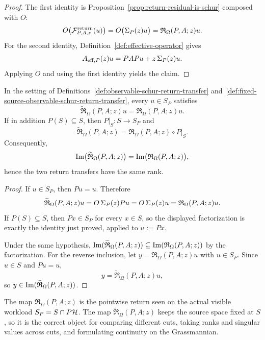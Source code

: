 \begin{proof}
The first identity is Proposition~\ref{prop:return-residual-is-schur} composed
with \(O\):
\[
O\bigl(\mathcal F^{\mathrm{return}}_{P,A,z}(u)\bigr)
=
O\bigl(\Sigma_{P}(z)u\bigr)
=
\mathfrak R_{\Omega}(P,A;z)u.
\]
For the second identity, Definition~\ref{def:effective-operator} gives
\[
A_{\mathrm{eff},P}(z)u=PAPu+z\,\Sigma_{P}(z)u.
\]
Applying \(O\) and using the first identity yields the claim.
\end{proof}

\begin{proposition}
\label{prop:fixed-source-return-restricts}
In the setting of
Definitions~\ref{def:observable-schur-return-transfer}
and~\ref{def:fixed-source-observable-schur-return-transfer}, every
\(u\in S_P\) satisfies
\[
\widetilde{\mathfrak R}_{\Omega}(P,A;z)u
=
\mathfrak R_{\Omega}(P,A;z)u.
\]
If in addition \(P(S)\subseteq S\), then \(P\big|_S:S\to S_P\) and
\[
\widetilde{\mathfrak R}_{\Omega}(P,A;z)
=
\mathfrak R_{\Omega}(P,A;z)\circ P\big|_S.
\]
Consequently,
\[
\mathrm{Im}\bigl(\widetilde{\mathfrak R}_{\Omega}(P,A;z)\bigr)
=
\mathrm{Im}\bigl(\mathfrak R_{\Omega}(P,A;z)\bigr),
\]
hence the two return transfers have the same rank.
\end{proposition}

\begin{proof}
If \(u\in S_P\), then \(Pu=u\). Therefore
\[
\widetilde{\mathfrak R}_{\Omega}(P,A;z)u
=
O\,\Sigma_{P}(z)Pu
=
O\,\Sigma_{P}(z)u
=
\mathfrak R_{\Omega}(P,A;z)u.
\]
If \(P(S)\subseteq S\), then \(Px\in S_P\) for every \(x\in S\), so the
displayed factorization is exactly the identity just proved, applied to
\(u:=Px\).

Under the same hypothesis,
\(\mathrm{Im}(\widetilde{\mathfrak R}_{\Omega}(P,A;z))\subseteq
\mathrm{Im}(\mathfrak R_{\Omega}(P,A;z))\) by the factorization. For the reverse
inclusion, let \(y=\mathfrak R_{\Omega}(P,A;z)u\) with \(u\in S_P\). Since
\(u\in S\) and \(Pu=u\),
\[
y
=
\widetilde{\mathfrak R}_{\Omega}(P,A;z)u,
\]
so \(y\in \mathrm{Im}(\widetilde{\mathfrak R}_{\Omega}(P,A;z))\).
\end{proof}

\begin{remark}
\label{rem:two-return-transfer-roles}
The map \(\mathfrak R_{\Omega}(P,A;z)\) is the pointwise return seen on the
actual visible workload \(S_P=S\cap P\mathcal{H}\). The map
\(\widetilde{\mathfrak R}_{\Omega}(P,A;z)\) keeps the source space fixed at
\(S\), so it is the correct object for comparing different cuts, taking ranks
and singular values across cuts, and formulating continuity on the
Grassmannian.
\end{remark}

